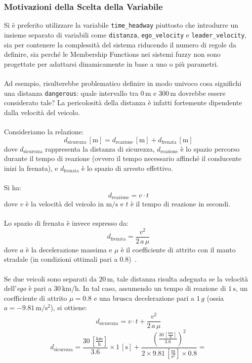 \subsubsection{Motivazioni della Scelta della Variabile} 
\label{subsubsection:th_motivazione}
Si è preferito utilizzare la variabile \texttt{time\_headway} piuttosto che introdurre un insieme separato di variabili come 
\texttt{distanza}, \texttt{ego\_velocity} e \texttt{leader\_velocity}, sia per contenere la complessità del sistema riducendo 
il numero di regole da definire, sia perché le Membership Functions nei sistemi fuzzy non sono progettate per adattarsi 
dinamicamente in base a uno o più parametri.
\\\\
Ad esempio, risulterebbe problematico definire in modo univoco cosa significhi una distanza \texttt{dangerous}: quale intervallo 
tra \(0\,\mathrm{m}\) e \(300\,\mathrm{m}\) dovrebbe essere considerato tale? La pericolosità della distanza è infatti fortemente 
dipendente dalla velocità del veicolo.
\\\\
Consideriamo la relazione:
\begin{equation}
  d_{\mathrm{sicurezza}}\,[\mathrm{m}] = d_{\mathrm{reazione}}\,[\mathrm{m}] + d_{\mathrm{frenata}}\,[\mathrm{m}]
  \label{eq:d_sicurezza}
\end{equation}
\noindent dove \(d_{\mathrm{sicurezza}}\) rappresenta la distanza di sicurezza, \(d_{\mathrm{reazione}}\) è lo spazio percorso durante il tempo di reazione (ovvero il tempo necessario affinché il conducente inizi la frenata), e \(d_{\mathrm{frenata}}\) è lo spazio di arresto effettivo.
\\\\
Si ha:
\[
d_{\mathrm{reazione}} = v \cdot t
\]
dove \(v\) è la velocità del veicolo in \(\mathrm{m/s}\) e \(t\) è il tempo di reazione in secondi.
\\\\
Lo spazio di frenata è invece espresso da:
\[
d_{\mathrm{frenata}} = \frac{v^2}{2\,a\,\mu}
\]
dove \(a\) è la decelerazione massima e \(\mu\) è il coefficiente di attrito con il manto stradale (in condizioni ottimali pari a 0.8)~\cite{distanza_di_sicurezza_youmath}.
\\\\
Se due veicoli sono separati da \(20\,\mathrm{m}\), tale distanza risulta adeguata se la velocità 
dell'\emph{ego} è pari a \(30\,\mathrm{km/h}\). In tal caso, assumendo un tempo di reazione di \(1\,\mathrm{s}\), 
un coefficiente di attrito \(\mu=0.8\) e una brusca decelerazione pari a \(1\,g\) (ossia \(a = -9.81\,\mathrm{m/s^2}\)), si ottiene:
\[
d_{\mathrm{sicurezza}} = v \cdot t + \frac{v^2}{2\,a\,\mu}
\]
\[
d_{\mathrm{sicurezza}} 
= \frac{30 \,\left[{\frac{\mathrm{km}}{\mathrm{h}}}\right]}{3.6} \times 1\,\mathrm{[s]} 
+ \frac{\left(\frac{30 \,\left[{\frac{\mathrm{km}}{\mathrm{h}}}\right]}{3.6}\right)^2}{2 \times 9.81\,\mathrm{\left[ \tfrac{m}{s^2} \right]} \times 0.8} =
\]

